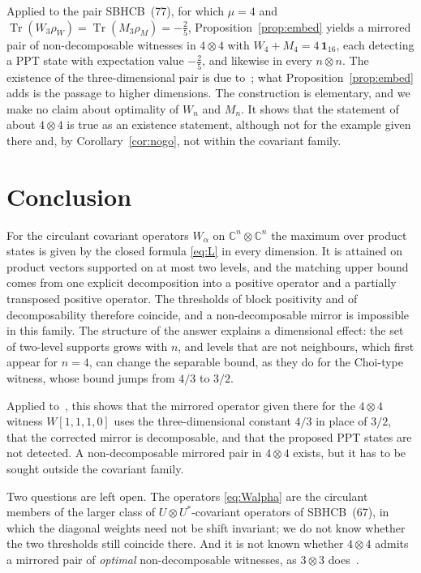 \documentclass[11pt,a4paper]{article}
\theoremstyle{remark}
\newcommand{\id}{\mathbf{1}}
\newcommand{\tr}{\operatorname{Tr}}
\begin{document}
Applied to the pair SBHCB~(77), for which $\mu=4$ and
$\tr(W_3\rho_W)=\tr(M_3\rho_M)=-\tfrac25$, Proposition~\ref{prop:embed} yields a mirrored
pair of non-decomposable witnesses in $4\otimes4$ with $W_4+M_4=4\,\id_{16}$, each
detecting a PPT state with expectation value $-\tfrac25$, and likewise in every
$n\otimes n$. The existence of the three-dimensional pair is due to~\cite{CBBH25}; what
Proposition~\ref{prop:embed} adds is the passage to higher dimensions. The construction
is elementary, and we make no claim about optimality of $W_n$ and $M_n$. It shows that
the statement of~\cite{SBHCB26} about $4\otimes4$ is true as an existence statement,
although not for the example given there and, by Corollary~\ref{cor:nogo}, not within the
covariant family.

\section{Conclusion}

For the circulant covariant operators $W_\alpha$ on $\mathbb{C}^n\otimes\mathbb{C}^n$ the
maximum over product states is given by the closed formula \eqref{eq:L} in every
dimension. It is attained on product vectors supported on at most two levels, and the
matching upper bound comes from one explicit decomposition into a positive operator and a
partially transposed positive operator. The thresholds of block positivity and of
decomposability therefore coincide, and a non-decomposable mirror is impossible in this
family. The structure of the answer explains a dimensional effect: the set of two-level
supports grows with $n$, and levels that are not neighbours, which first appear for
$n=4$, can change the separable bound, as they do for the Choi-type witness, whose bound
jumps from $4/3$ to $3/2$.

Applied to~\cite{SBHCB26}, this shows that the mirrored operator given there for the
$4\otimes4$ witness $W[1,1,1,0]$ uses the three-dimensional constant $4/3$ in place of
$3/2$, that the corrected mirror is decomposable, and that the proposed PPT states are
not detected. A non-decomposable mirrored pair in $4\otimes4$ exists, but it has to be
sought outside the covariant family.

Two questions are left open. The operators \eqref{eq:Walpha} are the circulant members
of the larger class of $U\otimes U^{*}$-covariant operators of SBHCB~(67), in which the
diagonal weights need not be shift invariant; we do not know whether the two thresholds
still coincide there. And it is not known whether $4\otimes4$ admits a mirrored pair of
\emph{optimal} non-decomposable witnesses, as $3\otimes3$ does~\cite{CBBH25}.
\end{document}
